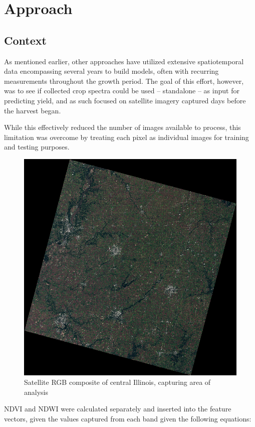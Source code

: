 \documentclass[conference]{IEEEtran}
\begin{document}
\section{Approach}
\subsection{Context}
As mentioned earlier, other approaches have utilized extensive spatiotemporal data encompassing several years to build models, often with recurring measurements throughout the growth period. \cite{PRASAD200626} The goal of this effort, however, was to see if collected crop spectra could be used -- standalone -- as input for predicting yield, and as such focused on satellite imagery captured days before the harvest began.

While this effectively reduced the number of images available to process, this limitation was overcome by treating each pixel as individual images for training and testing purposes.

\begin{figure}[t]
\includegraphics[width=\linewidth]{satellite}
\caption{Satellite RGB composite of central Illinois, capturing area of analysis}
\end{figure}

NDVI and NDWI were calculated separately and inserted into the feature vectors, given the values captured from each band given the following equations:
\end{document}

